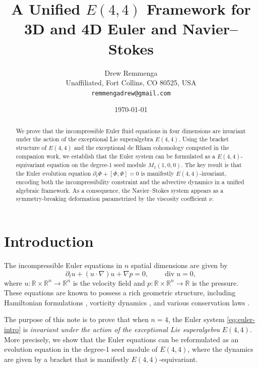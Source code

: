\documentclass[reqno,10pt]{amsart}
\theoremstyle{plain}
\theoremstyle{definition}
\def\gE{E(4,4)}
\def\div{\operatorname{div}}
\begin{document}
\title{A Unified $E(4,4)$ Framework for 3D and 4D Euler and Navier--Stokes}

\author{Drew Remmenga\\
  \normalfont\small Unaffiliated, Fort Collins, CO 80525, USA\\
  \normalfont\small\texttt{remmengadrew@gmail.com}}
\date{\today}

\begin{abstract}
We prove that the incompressible Euler fluid equations in four dimensions are invariant under the action of the exceptional Lie superalgebra $E(4,4)$.  Using the bracket structure of $\gE$ and the exceptional de Rham cohomology computed in the companion work, we establish that the Euler system can be formulated as a $\gE$-equivariant equation on the degree-1 seed module $M_1(1,0,0)$. The key result is that the Euler evolution equation $\partial_t \Phi + [\Phi,\Phi]=0$ is manifestly $\gE$-invariant, encoding both the incompressibility constraint and the advective dynamics in a unified algebraic framework. As a consequence, the Navier--Stokes system appears as a symmetry-breaking deformation parametrized by the viscosity coefficient $\nu$.
\end{abstract}

\maketitle
\tableofcontents

\section{Introduction}

The incompressible Euler equations in $n$ spatial dimensions are given by
\begin{equation}\label{eq:euler-intro}
  \partial_t u + (u\cdot\nabla)u + \nabla p = 0,
  \qquad \div u = 0,
\end{equation}
where $u:\mathbb{R}\times\mathbb{R}^n\to\mathbb{R}^n$ is the velocity field and $p:\mathbb{R}\times\mathbb{R}^n\to\mathbb{R}$ is the pressure. These equations are known to possess a rich geometric structure, including Hamiltonian formulations \cite{Arnold1966}, vorticity dynamics \cite{Majda1991}, and various conservation laws \cite{Chorin1967}. 

The purpose of this note is to prove that when $n=4$, the Euler system \eqref{eq:euler-intro} is \emph{invariant under the action of the exceptional Lie superalgebra} $E(4,4)$. More precisely, we show that the Euler equations can be reformulated as an evolution equation in the degree-1 seed module of $\gE$, where the dynamics are given by a bracket that is manifestly $\gE$-equivariant.
\end{document}
